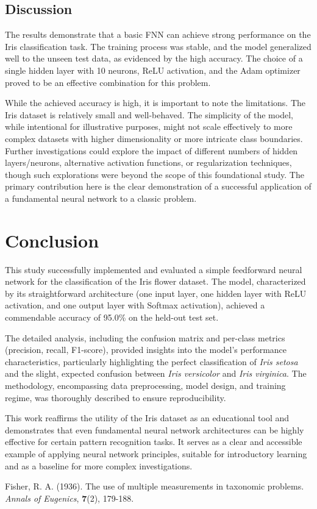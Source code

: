 \documentclass[12pt,a4paper]{article}
\begin{document}
	\subsection{Discussion}
	The results demonstrate that a basic FNN can achieve strong performance on the Iris classification task. The training process was stable, and the model generalized well to the unseen test data, as evidenced by the high accuracy. The choice of a single hidden layer with 10 neurons, ReLU activation, and the Adam optimizer proved to be an effective combination for this problem.
	
	While the achieved accuracy is high, it is important to note the limitations. The Iris dataset is relatively small and well-behaved. The simplicity of the model, while intentional for illustrative purposes, might not scale effectively to more complex datasets with higher dimensionality or more intricate class boundaries. Further investigations could explore the impact of different numbers of hidden layers/neurons, alternative activation functions, or regularization techniques, though such explorations were beyond the scope of this foundational study. The primary contribution here is the clear demonstration of a successful application of a fundamental neural network to a classic problem.
	
	\section{Conclusion}
	This study successfully implemented and evaluated a simple feedforward neural network for the classification of the Iris flower dataset. The model, characterized by its straightforward architecture (one input layer, one hidden layer with ReLU activation, and one output layer with Softmax activation), achieved a commendable accuracy of 95.0\% on the held-out test set.
	
	The detailed analysis, including the confusion matrix and per-class metrics (precision, recall, F1-score), provided insights into the model's performance characteristics, particularly highlighting the perfect classification of \textit{Iris setosa} and the slight, expected confusion between \textit{Iris versicolor} and \textit{Iris virginica}. The methodology, encompassing data preprocessing, model design, and training regime, was thoroughly described to ensure reproducibility.
	
	This work reaffirms the utility of the Iris dataset as an educational tool and demonstrates that even fundamental neural network architectures can be highly effective for certain pattern recognition tasks. It serves as a clear and accessible example of applying neural network principles, suitable for introductory learning and as a baseline for more complex investigations.
	
	\begin{thebibliography}{9}
		Fisher, R. A. (1936). The use of multiple measurements in taxonomic problems. \textit{Annals of Eugenics}, \textbf{7}(2), 179-188.
		
		
	\end{thebibliography}
	
\end{document}
